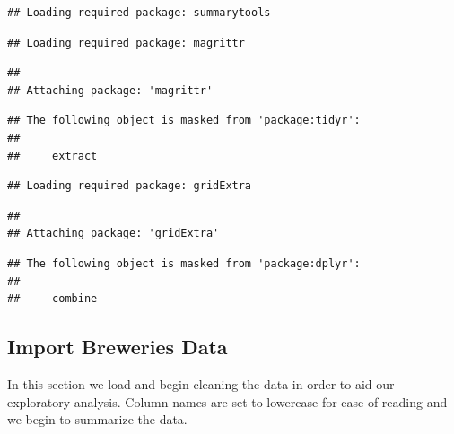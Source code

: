 \documentclass[]{article}
\begin{document}
\begin{verbatim}
## Loading required package: summarytools
\end{verbatim}

\begin{verbatim}
## Loading required package: magrittr
\end{verbatim}

\begin{verbatim}
## 
## Attaching package: 'magrittr'
\end{verbatim}

\begin{verbatim}
## The following object is masked from 'package:tidyr':
## 
##     extract
\end{verbatim}

\begin{verbatim}
## Loading required package: gridExtra
\end{verbatim}

\begin{verbatim}
## 
## Attaching package: 'gridExtra'
\end{verbatim}

\begin{verbatim}
## The following object is masked from 'package:dplyr':
## 
##     combine
\end{verbatim}

\subsection{Import Breweries Data}\label{import-breweries-data}

In this section we load and begin cleaning the data in order to aid our
exploratory analysis. Column names are set to lowercase for ease of
reading and we begin to summarize the data.
\end{document}

